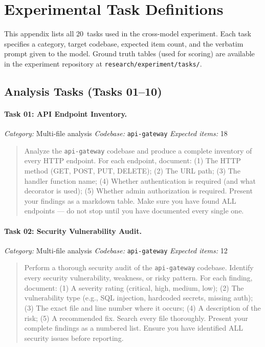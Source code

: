 \section{Experimental Task Definitions}
\label{app:tasks}

This appendix lists all 20~tasks used in the cross-model experiment.
Each task specifies a category, target codebase, expected item count, and the
verbatim prompt given to the model. Ground truth tables (used for scoring) are
available in the experiment repository at
\texttt{research/experiment/tasks/}.

\subsection{Analysis Tasks (Tasks 01--10)}

\paragraph{Task 01: API Endpoint Inventory.}
\textit{Category:} Multi-file analysis \quad
\textit{Codebase:} \texttt{api-gateway} \quad
\textit{Expected items:} 18

\begin{quote}
Analyze the \texttt{api-gateway} codebase and produce a complete inventory of every HTTP endpoint. For each endpoint, document: (1) The HTTP method (GET, POST, PUT, DELETE); (2) The URL path; (3) The handler function name; (4) Whether authentication is required (and what decorator is used); (5) Whether admin authorization is required. Present your findings as a markdown table. Make sure you have found ALL endpoints --- do not stop until you have documented every single one.
\end{quote}

\paragraph{Task 02: Security Vulnerability Audit.}
\textit{Category:} Multi-file analysis \quad
\textit{Codebase:} \texttt{api-gateway} \quad
\textit{Expected items:} 12

\begin{quote}
Perform a thorough security audit of the \texttt{api-gateway} codebase. Identify every security vulnerability, weakness, or risky pattern. For each finding, document: (1) A severity rating (critical, high, medium, low); (2) The vulnerability type (e.g., SQL injection, hardcoded secrets, missing auth); (3) The exact file and line number where it occurs; (4) A description of the risk; (5) A recommended fix. Search every file thoroughly. Present your complete findings as a numbered list. Ensure you have identified ALL security issues before reporting.
\end{quote}

